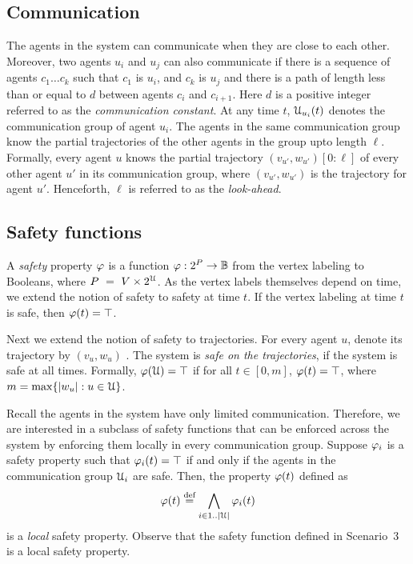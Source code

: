 \subsection{Communication}
The agents in the system can communicate when they are close to each other. Moreover, two agents $u_i$ and $u_j$ can also communicate if there is a sequence of agents $c_1\dots c_k$ such that $c_1$ is $u_i$, and $c_k$ is $u_j$ and there is a path of length less than or equal to $d$ between agents $c_{i}$ and $c_{i+1}$. Here $d$ is a positive integer referred to as the \emph{communication constant}. 
At any time $t$, $\mathcal{U}_{u_i}(t)$ denotes the communication group of agent $u_i$. The agents in the same communication group know the partial trajectories of the other agents in the group upto length $\ell$. Formally, every agent $u$ knows the partial trajectory $(v_{u'},w_{u'})[0:\ell]$ of every other agent $u'$ in its communication group, where $(v_{u'},w_{u'})$ is the trajectory for agent $u'$. Henceforth, $\ell$ is referred to as the \emph{look-ahead}.

\subsection{Safety functions}
A \emph{safety} property $\varphi$ is a function $\varphi: 2^P \to \mathbb{B}$ from the vertex labeling to Booleans, where $P~=~V \times 2^{\mathcal{U}}$.
As the vertex labels themselves depend on time, we extend the notion of safety to safety at time $t$. If the vertex labeling at time $t$ is safe, then $\varphi(t) = \top$.

Next we extend the notion of safety to trajectories. For every agent $u$, denote its trajectory by $(v_u,w_u)$ . The system is \emph{safe on the trajectories}, if the system is safe at all times. Formally, $\varphi(\mathcal{U}) = \top$ if for all $t \in [0,m]$, $\varphi(t) = \top$, where $m = \max \{|w_u|:u \in \mathcal{U} \}$.

Recall the agents in the system have only limited communication. Therefore, we are interested in a subclass of safety functions that can be enforced across the system by enforcing them locally in every communication group. 
Suppose $\varphi_i$ is a safety property such that $\varphi_i(t) = \top$ if and only if the agents in the communication group $\mathcal{U}_i$ are safe.
Then, the property $\varphi(t)$ defined as 
\begin{equation} 
\varphi(t) \stackrel{\text{def}}{=} \bigwedge_{i \in 1..|\mathcal{U}|} \varphi_i(t) 
\end{equation} 
\noindent is a \emph{local} safety property.
Observe that the safety function defined in Scenario~3 is a local safety property.

